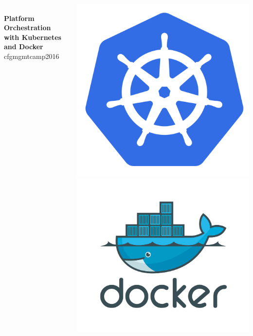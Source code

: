 \begin{frame} %
\begin{columns}[c] %
\begin{column}{.6\textwidth}
{\color{white}\Large
\\\textbf{Platform Orchestration with Kubernetes and Docker}}\\[.5cm]
cfgmgmtcamp2016\\
\end{column}
\hfill
\begin{column}{.4\textwidth}
\includegraphics[width=.7\textwidth]{kubernetes.png}\\
\hfill\includegraphics[width=.8\textwidth]{docker.png}
\end{column}
\end{columns}
\end{frame}

